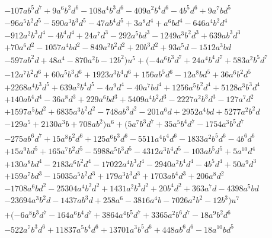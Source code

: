 \documentclass{gtpart}
\theoremstyle{definition}
\theoremstyle{remark}
\begin{document}
\begin{equation*}
\begin{split}
\qquad& - 107 a b^5 d^7 + 9 a^6 b^2 d^6 - 108 a^4 b^3 d^6 - 409 a^2 b^4 d^6 - 4 b^5 d^6 + 9 a^7 b d^5 \\
      & - 96 a^5 b^2 d^5 - 590 a^3 b^3 d^5 - 47 a b^4 d^5 + 3 a^8 d^4 + a^6 b d^4 - 646 a^4 b^2 d^4 \\
      & - 912 a^2 b^3 d^4 - 4 b^4 d^4 + 24 a^7 d^3 - 292 a^5 b d^3 - 1249 a^3 b^2 d^3 + 639 a b^3 d^3 \\
      & + 70 a^6 d^2 - 1057 a^4 b d^2 - 849 a^2 b^2 d^2 + 20 b^3 d^2 + 93 a^5 d - 1512 a^3 b d \\
      & - 597 a b^2 d + 48 a^4 - 870 a^2 b - 12 b^2) u^5 + (-4 a^6 b^3 d^7 + 24 a^4 b^4 d^7 + 583 a^2 b^5 d^7 \\
      & - 12 a^7 b^2 d^6 + 60 a^5 b^3 d^6 + 1923 a^3 b^4 d^6 + 156 a b^5 d^6 - 12 a^8 b d^5 + 36 a^6 b^2 d^5 \\
      & + 2268 a^4 b^3 d^5 + 639 a^2 b^4 d^5 - 4 a^9 d^4 - 40 a^7 b d^4 + 1256 a^5 b^2 d^4 + 5128 a^3 b^3 d^4 \\
      & + 140 a b^4 d^4 - 36 a^8 d^3 + 229 a^6 b d^3 + 5409 a^4 b^2 d^3 - 2227 a^2 b^3 d^3 - 127 a^7 d^2 \\
      & + 1597 a^5 b d^2 + 6835 a^3 b^2 d^2 - 748 a b^3 d^2 - 201 a^6 d + 2952 a^4 b d + 5277 a^2 b^2 d \\
      & - 129 a^5 + 2130 a^3 b + 708 a b^2) u^6 + (5 a^7 b^3 d^7 + 35 a^5 b^4 d^7 - 1754 a^3 b^5 d^7 \\
      & - 275 a b^6 d^7 + 15 a^8 b^2 d^6 + 125 a^6 b^3 d^6 - 5511 a^4 b^4 d^6 - 1833 a^2 b^5 d^6 - 4 b^6 d^6 \\
      & + 15 a^9 b d^5 + 165 a^7 b^2 d^5 - 5988 a^5 b^3 d^5 - 4312 a^3 b^4 d^5 - 103 a b^5 d^5 + 5 a^{10} d^4 \\
      & + 130 a^8 b d^4 - 2183 a^6 b^2 d^4 - 17022 a^4 b^3 d^4 - 2940 a^2 b^4 d^4 - 4 b^5 d^4 + 50 a^9 d^3 \\
      & + 159 a^7 b d^3 - 15035 a^5 b^2 d^3 + 179 a^3 b^3 d^3 + 1703 a b^4 d^3 + 206 a^8 d^2 \\
      & - 1708 a^6 b d^2 - 25304 a^4 b^2 d^2 + 1431 a^2 b^3 d^2 + 20 b^4 d^2 + 363 a^7 d - 4398 a^5 b d \\
      & - 23694 a^3 b^2 d - 1437 a b^3 d + 258 a^6 - 3816 a^4 b - 7026 a^2 b^2 - 12 b^3) u^7 \\
      & + (-6 a^8 b^3 d^7 - 164 a^6 b^4 d^7 + 3864 a^4 b^5 d^7 + 3365 a^2 b^6 d^7 - 18 a^9 b^2 d^6 \\
      & - 522 a^7 b^3 d^6 + 11837 a^5 b^4 d^6 + 13701 a^3 b^5 d^6 + 448 a b^6 d^6 - 18 a^{10} b d^5 \\

\end{split}
\end{equation*}
\end{document}
